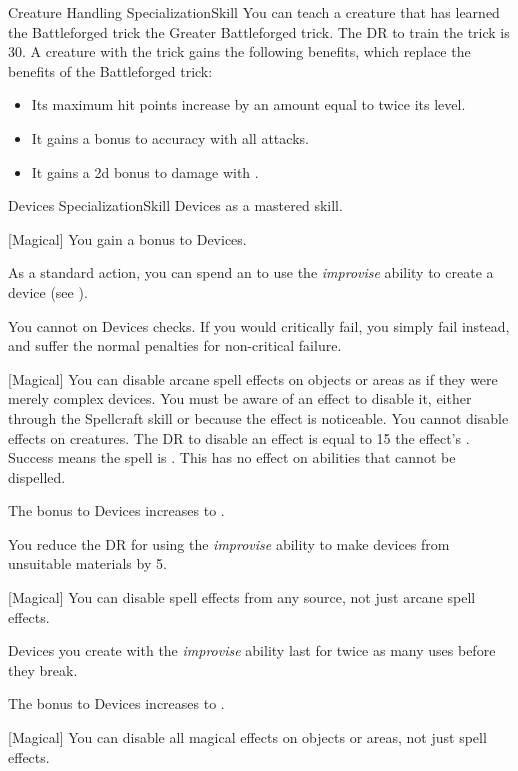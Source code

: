 \begin{feat}{Creature Handling Specialization}{Skill}
         You can teach a creature that has learned the Battleforged trick the Greater Battleforged trick.
        The DR to train the trick is 30.
        A creature with the trick gains the following benefits, which replace the benefits of the Battleforged trick:
        \begin{itemize}
            \item Its maximum hit points increase by an amount equal to twice its level.
            \item It gains a  bonus to accuracy with all attacks.
            \item It gains a \plus2d bonus to damage with .
        \end{itemize}
    \end{feat}

    \begin{feat}{Devices Specialization}{Skill}
        \featpre Devices as a mastered skill.
        \featben

        [Magical] You gain a  bonus to Devices.

         As a standard action, you can spend an  to use the \textit{improvise} ability to create a device (see ).

         You cannot  on Devices checks.
        If you would critically fail, you simply fail instead, and suffer the normal penalties for non-critical failure.

        [Magical] You can disable arcane spell effects on objects or areas as if they were merely complex devices.
        You must be aware of an effect to disable it, either through the Spellcraft skill or because the effect is noticeable.
        You cannot disable effects on creatures.
        The DR to disable an effect is equal to 15 \add the effect's .
        Success means the spell is .
        This has no effect on abilities that cannot be dispelled.

         The bonus to Devices increases to .

         You reduce the DR for using the \textit{improvise} ability to make devices from unsuitable materials by 5.

        [Magical] You can disable spell effects from any source, not just arcane spell effects.

         Devices you create with the \textit{improvise} ability last for twice as many uses before they break.

         The bonus to Devices increases to .

        [Magical] You can disable all magical effects on objects or areas, not just spell effects.
    \end{feat}

